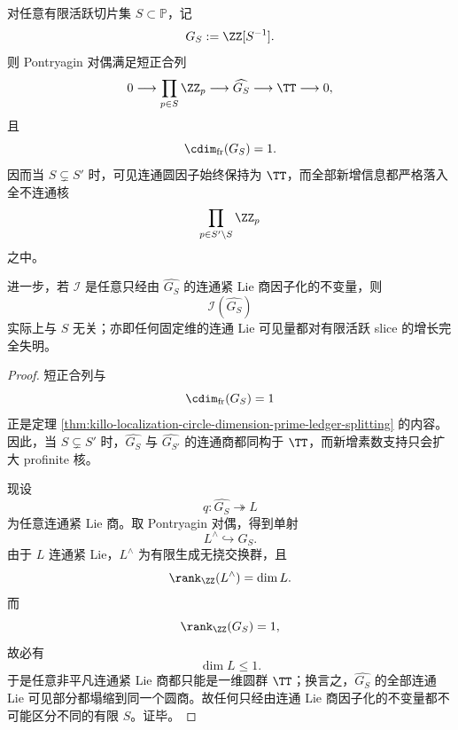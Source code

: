 \begin{theorem}\label{thm:conclusion-localization-visible-circle-blindness-slicegrowth}
对任意有限活跃切片集 \(S\subset\mathbb P\)，记
\[
G_S:=\ZZ[S^{-1}].
\]
则 Pontryagin 对偶满足短正合列
\[
0\longrightarrow \prod_{p\in S}\ZZ_p
\longrightarrow \widehat{G_S}
\longrightarrow \TT
\longrightarrow 0,
\]
且
\[
\cdim_{\mathrm{fr}}(G_S)=1.
\]
因而当 \(S\subsetneq S'\) 时，可见连通圆因子始终保持为 \(\TT\)，而全部新增信息都严格落入全不连通核
\[
\prod_{p\in S'\setminus S}\ZZ_p
\]
之中。

进一步，若 \(\mathcal I\) 是任意只经由 \(\widehat{G_S}\) 的连通紧 Lie 商因子化的不变量，则
\[
\mathcal I(\widehat{G_S})
\]
实际上与 \(S\) 无关；亦即任何固定维的连通 Lie 可见量都对有限活跃 slice 的增长完全失明。
\end{theorem}
\begin{proof}
短正合列与
\[
\cdim_{\mathrm{fr}}(G_S)=1
\]
正是定理 \ref{thm:killo-localization-circle-dimension-prime-ledger-splitting} 的内容。因此，当 \(S\subsetneq S'\) 时，\(\widehat{G_S}\) 与 \(\widehat{G_{S'}}\) 的连通商都同构于 \(\TT\)，而新增素数支持只会扩大 profinite 核。

现设
\[
q:\widehat{G_S}\twoheadrightarrow L
\]
为任意连通紧 Lie 商。取 Pontryagin 对偶，得到单射
\[
L^\wedge\hookrightarrow G_S.
\]
由于 \(L\) 连通紧 Lie，\(L^\wedge\) 为有限生成无挠交换群，且
\[
\rank_{\ZZ}(L^\wedge)=\dim L.
\]
而
\[
\rank_{\ZZ}(G_S)=1,
\]
故必有
\[
\dim L\le 1.
\]
于是任意非平凡连通紧 Lie 商都只能是一维圆群 \(\TT\)；换言之，\(\widehat{G_S}\) 的全部连通 Lie 可见部分都塌缩到同一个圆商。故任何只经由连通 Lie 商因子化的不变量都不可能区分不同的有限 \(S\)。证毕。
\end{proof}

\endinput
